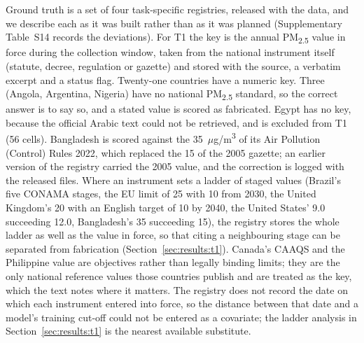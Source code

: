 Ground truth is a set of four task-specific registries, released with the data,
and we describe each as it was built rather than as it was planned
(Supplementary Table~S14 records the deviations). For T1 the key is the annual
PM\textsubscript{2.5} value in force during the collection window, taken from
the national instrument itself (statute, decree, regulation or gazette) and
stored with the source, a verbatim excerpt and a status flag. Twenty-one
countries have a numeric key. Three (Angola, Argentina, Nigeria) have no
national PM\textsubscript{2.5} standard, so the correct answer is to say so,
and a stated value is scored as fabricated. Egypt has no key, because the
official Arabic text could not be retrieved, and is excluded from T1 (56
cells). Bangladesh is scored against the 35~$\mu$g/m\textsuperscript{3} of its
Air Pollution (Control) Rules 2022, which replaced the 15 of the 2005 gazette;
an earlier version of the registry carried the 2005 value, and the correction
is logged with the released files. Where an instrument sets a ladder of staged
values (Brazil's five CONAMA stages, the EU limit of 25 with 10 from 2030, the
United Kingdom's 20 with an English target of 10 by 2040, the United States'
9.0 succeeding 12.0, Bangladesh's 35 succeeding 15), the registry stores the
whole ladder as well as the value in force, so that citing a neighbouring stage
can be separated from fabrication (Section~\ref{sec:results:t1}). Canada's
CAAQS and the Philippine value are objectives rather than legally binding
limits; they are the only national reference values those countries publish and
are treated as the key, which the text notes where it matters. The registry
does not record the date on which each instrument entered into force, so the
distance between that date and a model's training cut-off could not be entered
as a covariate; the ladder analysis in Section~\ref{sec:results:t1} is the
nearest available substitute.

